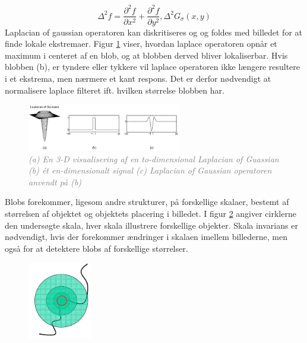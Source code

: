 \begin{equation}
\Delta^2 f = \dfrac{\partial^2 f}{\partial x^2}+\dfrac{\partial^2 f}{\partial y^2}, \Delta^2G_{\sigma}(x,y)
\label{lap}
\end{equation}
Laplacian of gaussian operatoren kan diskritiseres og og foldes med billedet for at finde lokale ekstremaer. Figur \ref{fig:lapgauss} viser, hvordan laplace operatoren opnår et maximum i centeret af en blob, og at blobben derved bliver lokaliserbar. Hvis blobben (b), er tyndere eller tykkere vil laplace operatoren ikke længere resultere i et ekstrema, men nærmere et kant respons. Det er derfor nødvendigt at normalisere laplace filteret ift. hvilken størrelse blobben har.
\begin{figure}[H]
    \centering
    \includegraphics[width=0.60\textwidth]{fig/16.png}
    \vspace{-0.5em}   
    \begin{center}
    \caption{\textcolor{gray}{\footnotesize \textit{
    (a) En 3-D visualisering af en to-dimensional Laplacian of Guassian (b) ét en-dimensionalt signal (c) Laplacian of Gaussian operatoren anvendt på (b)}}}
    \label{fig:lapgauss}
     \end{center}
  \end{figure}
       \vspace{-2.5em}
\noindent
Blobs forekommer, ligesom andre strukturer, på forskellige skalaer, bestemt af størrelsen af objektet og objektets placering i billedet. I figur \ref{fig:scale} angiver cirklerne den undersøgte skala, hver skala illustrere forskellige objekter. Skala invarians er nødvendigt, hvis der forekommer ændringer i skalaen imellem billederne, men også for at detektere blobs af forskellige størrelser.
\begin{figure}[H]
    \centering
    \includegraphics[width=0.25\textwidth]{fig/29.png}
    \vspace{-0.5em}   
    \begin{center}
    \caption{\textcolor{gray}{\footnotesize \textit{
    }}}
    \label{fig:scale}
     \end{center}
  \end{figure}
